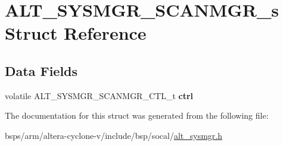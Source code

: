 \hypertarget{structALT__SYSMGR__SCANMGR__s}{}\section{A\+L\+T\+\_\+\+S\+Y\+S\+M\+G\+R\+\_\+\+S\+C\+A\+N\+M\+G\+R\+\_\+s Struct Reference}
\label{structALT__SYSMGR__SCANMGR__s}
\subsection*{Data Fields}
\begin{DoxyCompactItemize}
\item 
\mbox{\label{structALT__SYSMGR__SCANMGR__s_a299605e06c6ad1e7e999a19d4a61c716}} 
volatile A\+L\+T\+\_\+\+S\+Y\+S\+M\+G\+R\+\_\+\+S\+C\+A\+N\+M\+G\+R\+\_\+\+C\+T\+L\+\_\+t {\bfseries ctrl}
\end{DoxyCompactItemize}


The documentation for this struct was generated from the following file\+:\begin{DoxyCompactItemize}
\item 
bsps/arm/altera-\/cyclone-\/v/include/bsp/socal/\mbox{\hyperlink{alt__sysmgr_8h}{alt\+\_\+sysmgr.\+h}}\end{DoxyCompactItemize}
